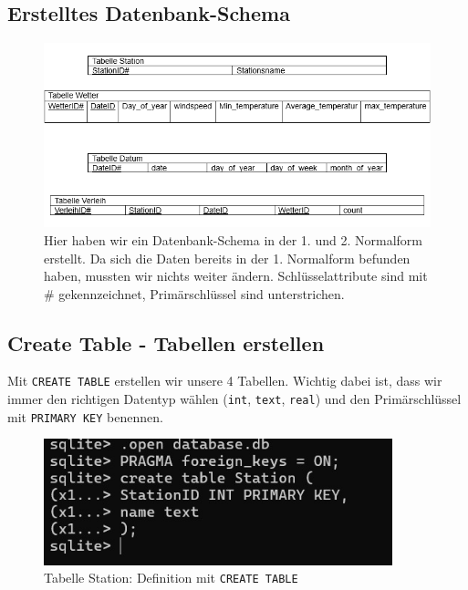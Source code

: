 \documentclass{article}
\begin{document}
\subsection{Erstelltes Datenbank-Schema}
\label{sec:datenbankschema}

\begin{figure}[h!]
    \centering
    \includegraphics[width=\textwidth]{datenbankschema[1].png}
    \caption{Hier haben wir ein Datenbank-Schema in der 1. und 2. Normalform erstellt. Da sich die Daten bereits in der 1. Normalform befunden haben, mussten wir nichts weiter ändern. Schlüsselattribute sind mit \# gekennzeichnet, Primärschlüssel sind unterstrichen.}
    \label{fig:datenbankschema}
\end{figure}

\newpage 

\newpage 



\label{sec:datenbank-schema}

\subsection{Create Table - Tabellen erstellen}
\label{sec:create-table}

Mit \texttt{CREATE TABLE} erstellen wir unsere 4 Tabellen. Wichtig dabei ist, dass wir immer den richtigen Datentyp wählen (\texttt{int}, \texttt{text}, \texttt{real}) und den Primärschlüssel mit \texttt{PRIMARY KEY} benennen.

\begin{figure}[h!]
    \centering
    \includegraphics[width=0.9\textwidth]{Nummer 1.jpg}
    \caption{Tabelle Station: Definition mit \texttt{CREATE TABLE}}
    \label{fig:table-station}
\end{figure}
\end{document}
